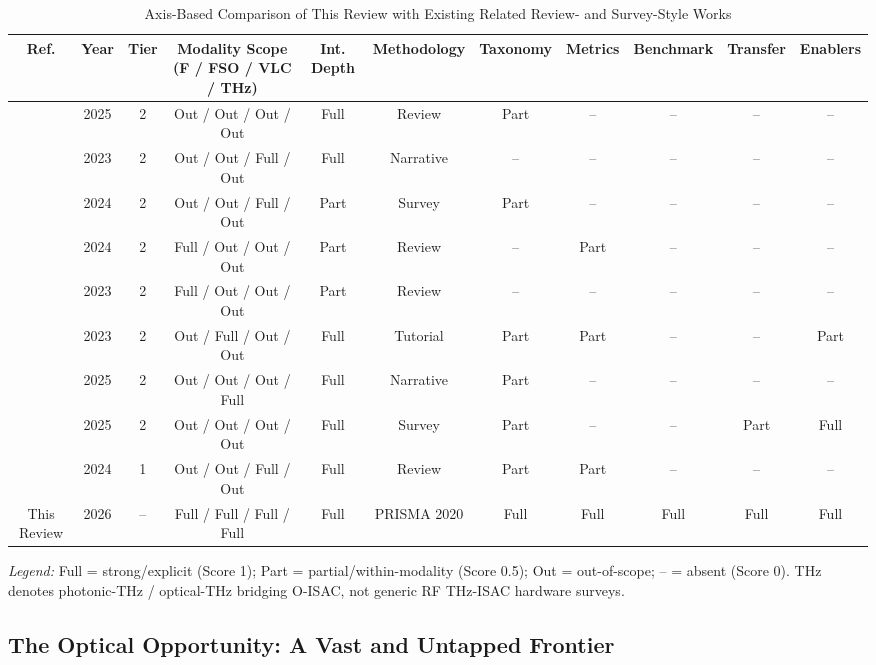 \begin{table}[!t]
\caption{Axis-Based Comparison of This Review with Existing Related Review- and Survey-Style Works}
\label{tab:intro-related}
\centering
\scriptsize
\setlength{\tabcolsep}{3pt}
\begin{tabular}{ccccccccccc}
\toprule
Ref. & Year & Tier & Modality Scope (F / FSO / VLC / THz) & Int. Depth & Methodology & Taxonomy & Metrics & Benchmark & Transfer & Enablers \\
\midrule
\cite{O_ISAC_161} & 2025 & 2 & Out / Out / Out / Out & Full & Review & Part & -- & -- & -- & -- \\
\cite{O_ISAC_068} & 2023 & 2 & Out / Out / Full / Out & Full & Narrative & -- & -- & -- & -- & -- \\
\cite{O_ISAC_327} & 2024 & 2 & Out / Out / Full / Out & Part & Survey & Part & -- & -- & -- & -- \\
\cite{O_ISAC_006} & 2024 & 2 & Full / Out / Out / Out & Part & Review & -- & Part & -- & -- & -- \\
\cite{O_ISAC_368} & 2023 & 2 & Full / Out / Out / Out & Part & Review & -- & -- & -- & -- & -- \\
\cite{O_ISAC_021} & 2023 & 2 & Out / Full / Out / Out & Full & Tutorial & Part & Part & -- & -- & Part \\
\cite{O_ISAC_070} & 2025 & 2 & Out / Out / Out / Full & Full & Narrative & Part & -- & -- & -- & -- \\
\cite{O_ISAC_163} & 2025 & 2 & Out / Out / Out / Out & Full & Survey & Part & -- & -- & Part & Full \\
\cite{O_ISAC_303} & 2024 & 1 & Out / Out / Full / Out & Full & Review & Part & Part & -- & -- & -- \\
This Review & 2026 & -- & Full / Full / Full / Full & Full & PRISMA 2020 & Full & Full & Full & Full & Full \\
\bottomrule
\end{tabular}
\vspace{0.4em}

\parbox{0.96\textwidth}{\footnotesize \textit{Legend:} Full = strong/explicit (Score 1); Part = partial/within-modality (Score 0.5); Out = out-of-scope; -- = absent (Score 0). THz denotes photonic-THz / optical-THz bridging O-ISAC, not generic RF THz-ISAC hardware surveys.}
\end{table}

\subsection{The Optical Opportunity: A Vast and Untapped Frontier}

